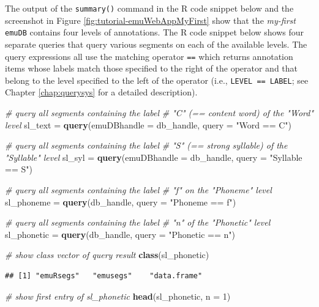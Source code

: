 \documentclass[]{book}
\newenvironment{Shaded}{\begin{snugshade}}{\end{snugshade}}
\newcommand{\CommentTok}[1]{\textcolor[rgb]{0.56,0.35,0.01}{\textit{#1}}}
\newcommand{\DataTypeTok}[1]{\textcolor[rgb]{0.13,0.29,0.53}{#1}}
\newcommand{\DecValTok}[1]{\textcolor[rgb]{0.00,0.00,0.81}{#1}}
\newcommand{\KeywordTok}[1]{\textcolor[rgb]{0.13,0.29,0.53}{\textbf{#1}}}
\newcommand{\NormalTok}[1]{#1}
\newcommand{\StringTok}[1]{\textcolor[rgb]{0.31,0.60,0.02}{#1}}
\theoremstyle{definition}
\theoremstyle{definition}
\theoremstyle{definition}
\theoremstyle{remark}
\begin{document}
The output of the \texttt{summary()} command in the R code snippet below
and the screenshot in Figure \ref{fig:tutorial-emuWebAppMyFirst} show
that the \emph{my-first} \texttt{emuDB} contains four levels of
annotations. The R code snippet below shows four separate queries that
query various segments on each of the available levels. The query
expressions all use the matching operator \texttt{==} which returns
annotation items whose labels match those specified to the right of the
operator and that belong to the level specified to the left of the
operator (i.e., \texttt{LEVEL\ ==\ LABEL}; see Chapter
\ref{chap:querysys} for a detailed description).

\begin{Shaded}
\begin{Highlighting}[]
\CommentTok{# query all segments containing the label}
\CommentTok{# "C" (== content word) of the "Word" level}
\NormalTok{sl_text =}\StringTok{ }\KeywordTok{query}\NormalTok{(}\DataTypeTok{emuDBhandle =}\NormalTok{ db_handle,}
                \DataTypeTok{query =} \StringTok{"Word == C"}\NormalTok{)}

\CommentTok{# query all segments containing the label}
\CommentTok{# "S" (== strong syllable) of the "Syllable" level}
\NormalTok{sl_syl =}\StringTok{ }\KeywordTok{query}\NormalTok{(}\DataTypeTok{emuDBhandle =}\NormalTok{ db_handle,}
               \DataTypeTok{query =} \StringTok{"Syllable == S"}\NormalTok{)}

\CommentTok{# query all segments containing the label}
\CommentTok{# "f" on the "Phoneme" level}
\NormalTok{sl_phoneme =}\StringTok{ }\KeywordTok{query}\NormalTok{(db_handle,}
                   \DataTypeTok{query =} \StringTok{"Phoneme == f"}\NormalTok{)}

\CommentTok{# query all segments containing the label}
\CommentTok{# "n" of the "Phonetic" level}
\NormalTok{sl_phonetic =}\StringTok{ }\KeywordTok{query}\NormalTok{(db_handle,}
                    \DataTypeTok{query =} \StringTok{"Phonetic == n"}\NormalTok{)}

\CommentTok{# show class vector of query result}
\KeywordTok{class}\NormalTok{(sl_phonetic)}
\end{Highlighting}
\end{Shaded}

\begin{verbatim}
## [1] "emuRsegs"   "emusegs"    "data.frame"
\end{verbatim}

\begin{Shaded}
\begin{Highlighting}[]
\CommentTok{# show first entry of sl_phonetic}
\KeywordTok{head}\NormalTok{(sl_phonetic, }\DataTypeTok{n =} \DecValTok{1}\NormalTok{)}
\end{Highlighting}
\end{Shaded}
\end{document}

